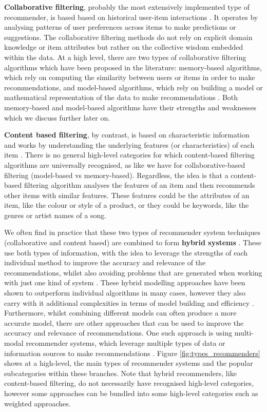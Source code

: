\textbf{Collaborative filtering}, probably the most extensively implemented type of recommender, is based based on historical user-item interactions \cite{thorat2015survey}. It operates by analysing patterns of user preferences across items to make predictions or suggestions. The collaborative filtering methods do not rely on explicit domain knowledge or item attributes but rather on the collective wisdom embedded within the data. At a high level, there are two types of collaborative filtering algorithms which have been proposed in the literature: memory-based algorithms, which rely on computing the similarity between users or items in order to make recommendations, and model-based algorithms, which rely on building a model or mathematical representation of the data to make recommendations \cite{thorat2015survey}. Both memory-based and model-based algorithms have their strengths and weaknesses which we discuss further later on. 

\textbf{Content based filtering}, by contrast, is based on characteristic information and works by understanding the underlying features (or characteristics) of each item \cite{thorat2015survey}. There is no general high-level categories for which content-based filtering algorithms are universally recognised, as like we have for collaborative-based filtering (model-based vs memory-based). Regardless, the idea is that a content-based filtering algorithm analyses the features of an item and then recommends other items with similar features. These features could be the attributes of an item, like the colour or style of a product, or they could be keywords, like the genres or artist names of a song. 

We often find in practice that these two types of recommender system techniques (collaborative and content based) are combined to form \textbf{hybrid systems} \cite{thorat2015survey}. These use both types of information, with the idea to leverage the strengths of each individual method to improve the accuracy and relevance of the recommendations, whilst also avoiding problems that are generated when working with just one kind of system \cite{thorat2015survey}. These hybrid modelling approaches have been shown to outperform individual algorithms in many cases, however they also carry with it additional complexities in terms of model building and efficiency \cite{ccano2017hybrid}. Furthermore, whilst combining different models can often produce a more accurate model, there are other approaches that can be used to improve the accuracy and relevance of recommendations. One such approach is using multi-modal recommender systems, which leverage multiple types of data or information sources to make recommendations \cite{ccano2017hybrid}. Figure \ref{fig:types_recommenders} shows at a high-level, the main types of recommender systems and the popular subcategories within these branches. Note that hybrid recommenders, like content-based filtering, do not necessarily have recognised high-level categories, however some approaches can be bundled into some high-level categories such as weighted approaches.

